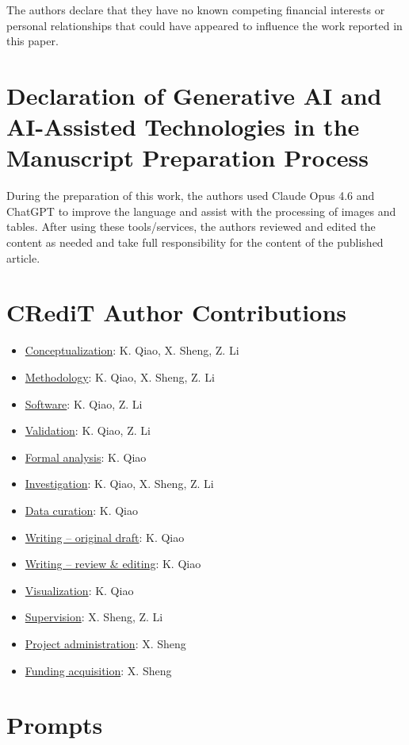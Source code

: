 \documentclass[preprint,10pt,times]{elsarticle}
\begin{document}
The authors declare that they have no known competing financial interests or personal relationships that could have appeared to influence the work reported in this paper.

\section*{Declaration of Generative AI and AI-Assisted Technologies in the Manuscript Preparation Process}

During the preparation of this work, the authors used Claude Opus 4.6 and ChatGPT to improve the language and assist with the processing of images and tables. After using these tools/services, the authors reviewed and edited the content as needed and take full responsibility for the content of the published article.

\section*{CRediT Author Contributions}

\begin{itemize}
\item \underline{Conceptualization}: K. Qiao, X. Sheng, Z. Li
\item \underline{Methodology}: K. Qiao, X. Sheng, Z. Li
\item \underline{Software}: K. Qiao, Z. Li
\item \underline{Validation}: K. Qiao, Z. Li
\item \underline{Formal analysis}: K. Qiao
\item \underline{Investigation}: K. Qiao, X. Sheng, Z. Li
\item \underline{Data curation}: K. Qiao
\item \underline{Writing -- original draft}: K. Qiao
\item \underline{Writing -- review \& editing}: K. Qiao
\item \underline{Visualization}: K. Qiao
\item \underline{Supervision}: X. Sheng, Z. Li
\item \underline{Project administration}: X. Sheng
\item \underline{Funding acquisition}: X. Sheng
\end{itemize}

\clearpage
\appendix
\section{Prompts}
\label{app:prompts}
\end{document}
